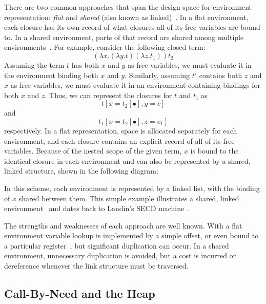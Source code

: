 \documentclass[preprint]{sigplanconf}
\begin{document}
There are two common approaches that span the design space for environment
representation: \emph{flat} and \emph{shared} (also
known as linked)~\cite{appel1988optimizing, shao1994space}. In a flat
environment, each closure has its own record of what closures all
of its free variables are bound to. In a shared environment, parts
of that record are shared among multiple environments~\cite{appel1988optimizing,
shao1994space}. For example, consider the following closed term: $$(\lambda
x.(\lambda y.t) (\lambda z.t_1)) t_2$$ Assuming the term $t$ has both $x$ and
$y$ as free variables, we must evaluate it in the environment binding both $x$
and $y$.  Similarly, assuming $t'$ contains both $z$ and $x$ as free variables,
we must evaluate it in an environment containing bindings for both $x$ and $z$.
Thus, we can represent the closures for $t$ and $t_1$ as $$t[x=t_2[\bullet],
y=c]$$ and $$t_1[x=t_2[\bullet], z=c_1]$$ respectively. In a flat
representation, space is allocated separately for each environment, and each
closure contains an explicit record of all of its free variables. Because of the
nested scope of the given term, $x$ is bound to the identical closure in each
environment and can also be represented by a shared, linked structure, shown in
the following diagram:

\begin{center}
\end{center}
In this scheme, each environment is represented by a linked list, with
the binding of $x$ shared between them. This simple example
illustrates a shared, linked environment~\cite{appel1988optimizing}
and dates back to Landin's SECD machine~\cite{landin1964mechanical}.

The strengths and weaknesses of each approach are well known.  With a flat
environment variable lookup is implemented by a simple offset, or even
bound to a particular register~\cite{jonesstg, appel2006compiling},
but significant duplication can occur.  In a shared environment, unnecessary
duplication is avoided, but a cost is incurred on dereference whenever the
link structure must be traversed.

\subsection{Call-By-Need and the Heap}
\end{document}
